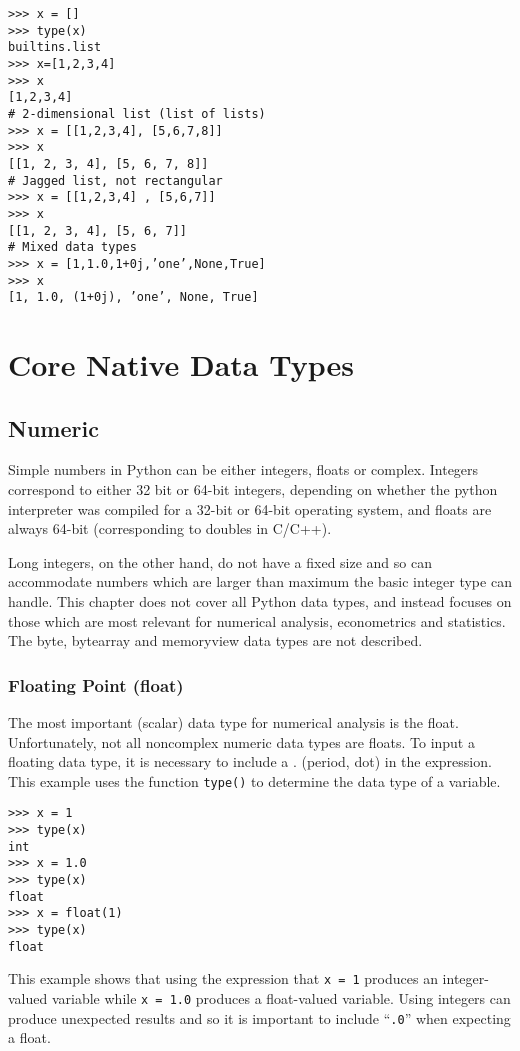 \documentclass[KSmain.tex]{subfiles}
\begin{document}
\begin{framed}
\begin{verbatim}
>>> x = []
>>> type(x)
builtins.list
>>> x=[1,2,3,4]
>>> x
[1,2,3,4]
# 2-dimensional list (list of lists)
>>> x = [[1,2,3,4], [5,6,7,8]]
>>> x
[[1, 2, 3, 4], [5, 6, 7, 8]]
# Jagged list, not rectangular
>>> x = [[1,2,3,4] , [5,6,7]]
>>> x
[[1, 2, 3, 4], [5, 6, 7]]
# Mixed data types
>>> x = [1,1.0,1+0j,’one’,None,True]
>>> x
[1, 1.0, (1+0j), ’one’, None, True]

\end{verbatim}
\end{framed}

\newpage

\section{Core Native Data Types}
\subsection{ Numeric}
Simple numbers in Python can be either integers, floats or complex. Integers correspond to either 32
bit or 64-bit integers, depending on whether the python interpreter was compiled for a 32-bit or 64-bit
operating system, and floats are always 64-bit (corresponding to doubles in C/C++). 

Long integers, on the
other hand, do not have a fixed size and so can accommodate numbers which are larger than maximum
the basic integer type can handle. This chapter does not cover all Python data types, and instead focuses
on those which are most relevant for numerical analysis, econometrics and statistics. The byte, bytearray
and memoryview data types are not described.

\subsubsection{Floating Point (float)}
The most important (scalar) data type for numerical analysis is the float. Unfortunately, not all noncomplex
numeric data types are floats. To input a floating data type, it is necessary to include a . (period,
dot) in the expression. This example uses the function \texttt{type()} to determine the data type of a variable.
\begin{framed}
\begin{verbatim}
>>> x = 1
>>> type(x)
int
>>> x = 1.0
>>> type(x)
float
>>> x = float(1)
>>> type(x)
float
\end{verbatim}
\end{framed}
This example shows that using the expression that \texttt{x = 1} produces an integer-valued variable while \texttt{x = 1.0}
produces a float-valued variable. Using integers can produce unexpected results and so it is important to
include ``\texttt{.0}” when expecting a float.
\end{document}
